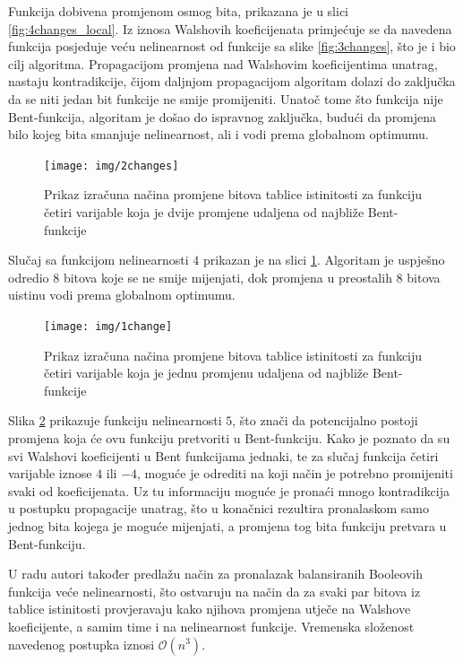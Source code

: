 Funkcija dobivena promjenom osmog bita, prikazana je u slici \ref{fig:4changes_local}.
Iz iznosa Walshovih koeficijenata primjećuje se da navedena funkcija posjeduje veću nelinearnost od funkcije sa slike \ref{fig:3changes}, što je i bio cilj algoritma.
Propagacijom promjena nad Walshovim koeficijentima unatrag, nastaju kontradikcije, čijom daljnjom propagacijom algoritam dolazi do zaključka da se niti jedan bit funkcije ne smije promijeniti.
Unatoč tome što funkcija nije Bent-funkcija, algoritam je došao do ispravnog zaključka, budući da promjena bilo kojeg bita smanjuje nelinearnost, ali i vodi prema globalnom optimumu.

\begin{figure}[ht!] 
    \centering
    \texttt{[image: img/2changes]}
    \captionsetup{justification=centering}
    \caption{Prikaz izračuna načina promjene bitova tablice istinitosti za funkciju četiri varijable koja je dvije promjene udaljena od najbliže Bent-funkcije}
    \label{fig:2changes}
\end{figure}

Slučaj sa funkcijom nelinearnosti $4$ prikazan je na slici \ref{fig:2changes}.
Algoritam je uspješno odredio $8$ bitova koje se ne smije mijenjati, dok promjena u preostalih $8$ bitova uistinu vodi prema globalnom optimumu.

\begin{figure}[ht!] 
    \centering
    \texttt{[image: img/1change]}
    \captionsetup{justification=centering}
    \caption{Prikaz izračuna načina promjene bitova tablice istinitosti za funkciju četiri varijable koja je jednu promjenu udaljena od najbliže Bent-funkcije}
    \label{fig:1change}
\end{figure}

Slika \ref{fig:1change} prikazuje funkciju nelinearnosti $5$, što znači da potencijalno postoji promjena koja će ovu funkciju pretvoriti u Bent-funkciju.
Kako je poznato da su svi Walshovi koeficijenti u Bent funkcijama jednaki, te za slučaj funkcija četiri varijable iznose $4$ ili $-4$, moguće je odrediti na koji način je potrebno promijeniti svaki od koeficijenata.
Uz tu informaciju moguće je pronaći mnogo kontradikcija u postupku propagacije unatrag, što u konačnici rezultira pronalaskom samo jednog bita kojega je moguće mijenjati, a promjena tog bita funkciju pretvara u Bent-funkciju. 

U radu \cite{millan1997smart} autori također predlažu način za pronalazak balansiranih Booleovih funkcija veće nelinearnosti, što ostvaruju na način da za svaki par bitova iz tablice istinitosti provjeravaju kako njihova promjena utječe na Walshove koeficijente, a samim time i na nelinearnost funkcije.
Vremenska složenost navedenog postupka iznosi $\mathcal{O}(n^3)$.

